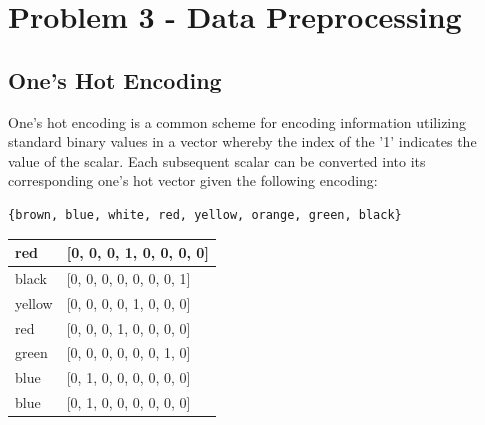 \documentclass[12pt, letterpaper]{report}
\begin{document}
\begin{figure}[H]
	\captionsetup[subfigure]{labelformat=empty}
	\centering
	\qquad
	\label{fig:example}
\end{figure}

\section{Problem 3 - Data Preprocessing}

\subsection{One's Hot Encoding}

One's hot encoding is a common scheme for encoding information utilizing standard binary values in a vector whereby the index of the '1' indicates the value of the scalar. Each subsequent scalar can be converted into its corresponding one's hot vector given the following encoding:
\begin{verbatim}
{brown, blue, white, red, yellow, orange, green, black}
\end{verbatim}

\begin{center}
	\begin{tabular}{ |l|l| } 
		\hline
		red & [0, 0, 0, 1, 0, 0, 0, 0] \\
		\hline
		black & [0, 0, 0, 0, 0, 0, 0, 1] \\
		\hline
		yellow & [0, 0, 0, 0, 1, 0, 0, 0] \\
		\hline
		red & [0, 0, 0, 1, 0, 0, 0, 0] \\
		\hline
		green & [0, 0, 0, 0, 0, 0, 1, 0] \\
		\hline
		blue & [0, 1, 0, 0, 0, 0, 0, 0] \\
		\hline
		blue & [0, 1, 0, 0, 0, 0, 0, 0] \\
		\hline
	\end{tabular}
\end{center}
\end{document}
